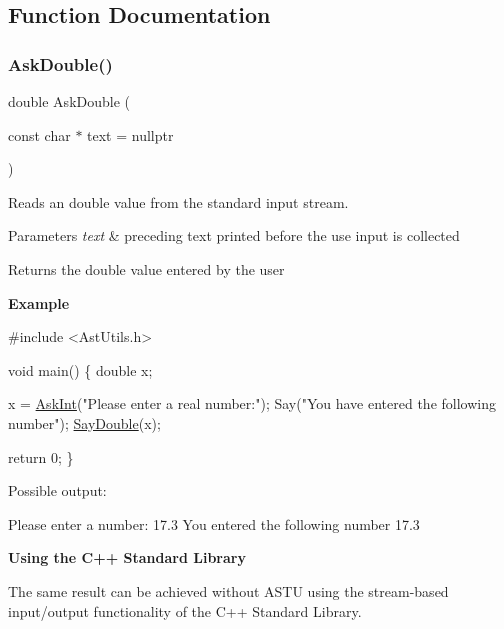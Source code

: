\subsection{Function Documentation}
\mbox{\label{group__io__group_ga2ecfe90c9b28dec6725b8df1a0013d0d}} 
\subsubsection{\texorpdfstring{Ask\+Double()}{AskDouble()}}
{\footnotesize\ttfamily double Ask\+Double (\begin{DoxyParamCaption}\item[{const char $\ast$}]{text = {\ttfamily nullptr} }\end{DoxyParamCaption})}

Reads an double value from the standard input stream.


\begin{DoxyParams}{Parameters}
{\em text} & preceding text printed before the use input is collected \\
\hline
\end{DoxyParams}
\begin{DoxyReturn}{Returns}
the double value entered by the user
\end{DoxyReturn}
{\bfseries Example} 
\begin{DoxyCode}
\textcolor{preprocessor}{#include <AstUtils.h>}

\textcolor{keywordtype}{void} main()
\{
  \textcolor{keywordtype}{double} x;

  x = \hyperlink{group__io__group_gae3d41902eb45488b04016096918d605c}{AskInt}(\textcolor{stringliteral}{"Please enter a real number:"});
  Say(\textcolor{stringliteral}{"You have entered the following number"});
  \hyperlink{group__io__group_ga6af59270fa536fa4c3e9f8434a8fb4a0}{SayDouble}(x);

  \textcolor{keywordflow}{return} 0;
\}
\end{DoxyCode}
 Possible output\+: 
\begin{DoxyCode}
Please enter a number: 17.3
You entered the following number
17.3
\end{DoxyCode}


{\bfseries Using the C++ Standard Library}

The same result can be achieved without A\+S\+TU using the stream-\/based input/output functionality of the C++ Standard Library.


